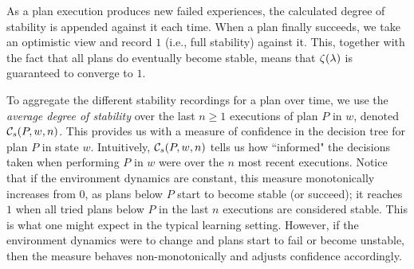 \begin{algorithm}[h]
\caption{$\UpdateDegreeStability(\lambda)$}
\label{alg:degree}
\end{algorithm}


As a plan execution produces new failed experiences, the calculated degree of stability is appended against it each time. When a plan finally succeeds, we take an optimistic view and record $1$ (i.e., full stability) against it. This, together with the fact that all plans do eventually become stable, means that $\zeta(\lambda)$ is guaranteed to converge to $1$. 


To aggregate the different stability recordings for a plan over time, we use the \emph{average degree of stability} over the last $n \geq 1$ executions of plan $P$ in $w$, denoted ${\mathcal{C}}_s(P,w,n)$. 
This provides us with a measure of confidence in the decision tree for plan $P$ in state $w$. Intuitively, ${\mathcal{C}}_s(P,w,n)$ tells us how ``informed" the decisions taken when performing $P$ in $w$ were over the $n$ most recent executions.
Notice that if the environment dynamics are constant, this measure monotonically increases from $0$, as plans below $P$ start to become stable (or succeed); it reaches $1$ when all tried plans below $P$ in the last $n$ executions are considered stable. This is what one might expect in the typical learning setting. However, if the environment dynamics were to change and plans start to fail or become unstable, then the measure behaves non-monotonically and adjusts confidence accordingly.


% 
% 
% 
% 
% 


